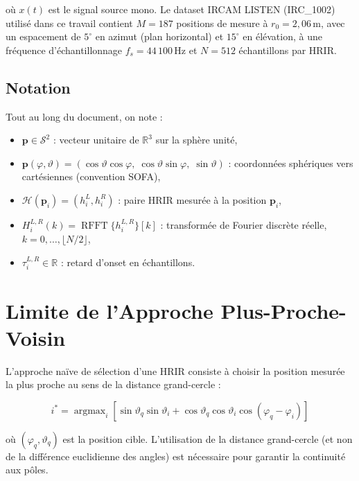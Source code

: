 \documentclass[12pt, a4paper]{article}
\theoremstyle{definition}
\newcommand{\R}{\mathbb{R}}
\newcommand{\vect}[1]{\bm{#1}}
\DeclareMathOperator{\argmax}{argmax}
\DeclareMathOperator{\rfft}{RFFT}
\begin{document}
où $x(t)$ est le signal source mono. Le dataset IRCAM LISTEN (IRC\_1002)
utilisé dans ce travail contient $M = 187$ positions de mesure à
$r_0 = 2{,}06\,\text{m}$, avec un espacement de $5^\circ$ en azimut
(plan horizontal) et $15^\circ$ en élévation, à une fréquence
d'échantillonnage $f_s = 44\,100\,\text{Hz}$ et $N = 512$ échantillons
par HRIR.

\subsection{Notation}

Tout au long du document, on note :
\begin{itemize}
  \item $\vect{p} \in \mathcal{S}^2$ : vecteur unitaire de $\R^3$ sur la sphère unité,
  \item $\vect{p}(\varphi, \vartheta) = (\cos\vartheta\cos\varphi,\;
        \cos\vartheta\sin\varphi,\; \sin\vartheta)$ : coordonnées sphériques
        vers cartésiennes (convention SOFA),
  \item $\mathcal{H}(\vect{p}_i) = (h_i^L, h_i^R)$ : paire HRIR mesurée à la
        position $\vect{p}_i$,
  \item $H_i^{L,R}(k) = \rfft\{h_i^{L,R}\}[k]$ : transformée de Fourier
        discrète réelle, $k = 0, \ldots, \lfloor N/2 \rfloor$,
  \item $\tau_i^{L,R} \in \R$ : retard d'onset en échantillons.
\end{itemize}

\section{Limite de l'Approche Plus-Proche-Voisin}

L'approche naïve de sélection d'une HRIR consiste à choisir la position mesurée
la plus proche au sens de la distance grand-cercle :

\begin{equation}
  i^* = \argmax_{i} \left[
    \sin\vartheta_q \sin\vartheta_i
    + \cos\vartheta_q \cos\vartheta_i \cos(\varphi_q - \varphi_i)
  \right]
\end{equation}

où $(\varphi_q, \vartheta_q)$ est la position cible. L'utilisation de la
distance grand-cercle (et non de la différence euclidienne des angles) est
nécessaire pour garantir la continuité aux pôles.
\end{document}
